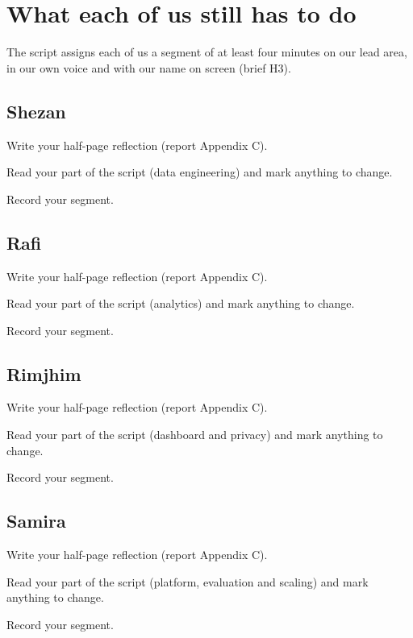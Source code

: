 \section*{What each of us still has to do}
The script assigns each of us a segment of at least four minutes on our lead area, in our own voice and with
our name on screen (brief H3).

\subsection*{Shezan}
\begin{checklist}
\item Write your half-page reflection (report Appendix C).
\item Read your part of the script (data engineering) and mark anything to change.
\item Record your segment.
\end{checklist}

\subsection*{Rafi}
\begin{checklist}
\item Write your half-page reflection (report Appendix C).
\item Read your part of the script (analytics) and mark anything to change.
\item Record your segment.
\end{checklist}

\subsection*{Rimjhim}
\begin{checklist}
\item Write your half-page reflection (report Appendix C).
\item Read your part of the script (dashboard and privacy) and mark anything to change.
\item Record your segment.
\end{checklist}

\subsection*{Samira}
\begin{checklist}
\item Write your half-page reflection (report Appendix C).
\item Read your part of the script (platform, evaluation and scaling) and mark anything to change.
\item Record your segment.
\end{checklist}

